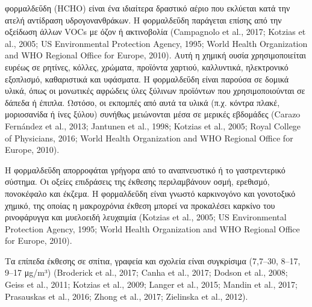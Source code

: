 φορμαλδεΰδη (HCHO) είναι ένα ιδιαίτερα δραστικό αέριο που εκλύεται κατά την ατελή αντίδραση υδρογονανθράκων. Η φορμαλδεΰδη παράγεται επίσης από την οξείδωση άλλων VOCs με όζον ή ακτινοβολία (Campagnolo et al., 2017; Kotzias et al., 2005; US Environmental Protection Agency, 1995; World Health Organization and WHO Regional Office for Europe, 2010). Αυτή η χημική ουσία χρησιμοποιείται ευρέως σε ρητίνες, κόλλες, χρώματα, προϊόντα χαρτιού, καλλυντικά, ηλεκτρονικό εξοπλισμό, καθαριστικά και υφάσματα. Η φορμαλδεΰδη είναι παρούσα σε δομικά υλικά, όπως οι μονωτικές αφρώδεις ύλες ξύλινων προϊόντων που χρησιμοποιούνται σε δάπεδα ή έπιπλα. Ωστόσο, οι εκπομπές από αυτά τα υλικά (π.χ. κόντρα πλακέ, μοριοσανίδα ή ίνες ξύλου) συνήθως μειώνονται μέσα σε μερικές εβδομάδες (Carazo Fernández et al., 2013; Jantunen et al., 1998; Kotzias et al., 2005; Royal College of Physicians, 2016; World Health Organization and WHO Regional Office for Europe, 2010).

Η φορμαλδεΰδη απορροφάται γρήγορα από το αναπνευστικό ή το γαστρεντερικό σύστημα. Οι οξείες επιδράσεις της έκθεσης περιλαμβάνουν οσμή, ερεθισμό, πονοκέφαλο και έκζεμα. Η φορμαλδεΰδη είναι γνωστό καρκινογόνο και γονοτοξικό χημικό, της οποίας η μακροχρόνια έκθεση μπορεί να προκαλέσει καρκίνο του ρινοφάρυγγα και μυελοειδή λευχαιμία (Kotzias et al., 2005; US Environmental Protection Agency, 1995; World Health Organization and WHO Regional Office for Europe, 2010).

Τα επίπεδα έκθεσης σε σπίτια, γραφεία και σχολεία είναι συγκρίσιμα (7,7–30, 8–17, 9–17 μg/m³) (Broderick et al., 2017; Canha et al., 2017; Dodson et al., 2008; Geiss et al., 2011; Kotzias et al., 2009; Langer et al., 2015; Mandin et al., 2017; Prasauskas et al., 2016; Zhong et al., 2017; Zielinska et al., 2012).

